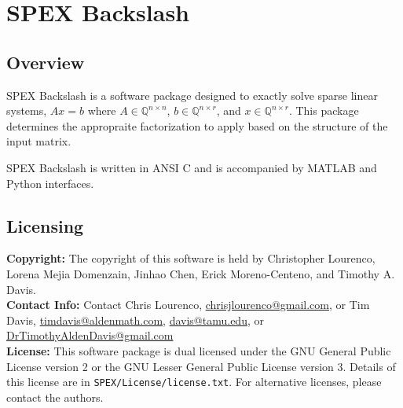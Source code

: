\documentclass[12pt,oneside]{book}
\theoremstyle{definition}
\begin{document}
\chapter{SPEX Backslash}\vspace{-0.75in} \label{ch:Backslash}

\section{Overview} \label{s:Backslash:intro}
SPEX Backslash is a software package designed to exactly solve sparse
linear systems, $A x = b$ where $A \in \mathbb{Q}^{n \times
n}$, $b \in \mathbb{Q}^{n \times r}$, and $x \in \mathbb{Q}^{n \times
r}$. This package determines the appropraite factorization to apply based on the
structure of the input matrix.

SPEX Backslash is written in ANSI C and is accompanied by MATLAB and Python interfaces.

 
\section{Licensing} \label{s:Backslash:licensing}
\textbf{Copyright:} The copyright of this software is held by  Christopher Lourenco, Lorena Mejia Domenzain, Jinhao Chen, Erick Moreno-Centeno, and Timothy A. Davis.\\

\noindent \textbf{Contact Info:} Contact Chris Lourenco,
\href{mailto:chrisjlourenco@gmail.com}{chrisjlourenco@gmail.com}, or Tim Davis,
\href{mailto:timdavis@aldenmath.com}{timdavis@aldenmath.com},
\href{mailto:davis@tamu.edu}{davis@tamu.edu}, or
\href{DrTimothyAldenDavis@gmail.com}{DrTimothyAldenDavis@gmail.com}\\

\noindent \textbf{License:} This software package is dual licensed under the GNU General Public License version 2 or the GNU Lesser General Public License version 3. Details of this license are in \verb|SPEX/License/license.txt|. For alternative licenses, please contact the authors.

\newpage
\end{document}
